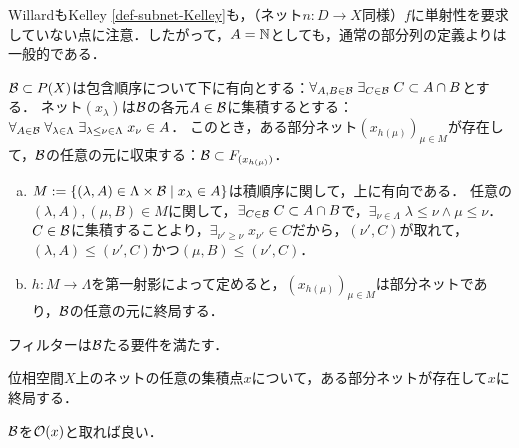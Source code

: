 \documentclass[uplatex,dvipdfmx]{jsreport}
\begin{document}
\begin{remark}
    WillardもKelley \ref{def-subnet-Kelley}も，（ネット$n:D\to X$同様）$f$に単射性を要求していない点に注意．したがって，$A=\mathbb{N}$としても，通常の部分列の定義よりは一般的である．
\end{remark}

\begin{lemma}[集積点の特徴付け]
    $\mathcal{B}\subset P(X)$は包含順序について下に有向とする：$\forall_{A,B\in\mathcal{B}}\;\exists_{C\in\mathcal{B}}\;C\subset A\cap B$とする．
    ネット$(x_\lambda)$は$\mathcal{B}$の各元$A\in\mathcal{B}$に集積するとする：
    $\forall_{A\in\mathcal{B}}\;\forall_{\lambda\in\Lambda}\;\exists_{\lambda\le\nu\in\Lambda}\;x_\nu\in A$．
    このとき，ある部分ネット$(x_{h(\mu)})_{\mu\in M}$が存在して，$\mathcal{B}$の任意の元に収束する：$\mathcal{B}\subset F_{(x_{h(\mu)})}$．
\end{lemma}
\begin{Proof}\mbox{}
    \begin{enumerate}[(a)]
        \item $M:=\left\{(\lambda,A)\in\Lambda\times\mathcal{B}\mid x_\lambda\in A\right\}$は積順序に関して，上に有向である．
        任意の$(\lambda,A),(\mu,B)\in M$に関して，$\exists_{C\in\mathcal{B}}\;C\subset A\cap B$で，$\exists_{\nu\in\Lambda}\;\lambda\le\nu\land\mu\le\nu$．
        $C\in\mathcal{B}$に集積することより，$\exists_{\nu'\ge\nu}\;x_{\nu'}\in C$だから，$(\nu',C)$が取れて，$(\lambda,A)\le(\nu',C)$かつ$(\mu,B)\le(\nu',C)$．
        \item $h:M\to\Lambda$を第一射影によって定めると，$(x_{h(\mu)})_{\mu\in M}$は部分ネットであり，$\mathcal{B}$の任意の元に終局する．
    \end{enumerate}
\end{Proof}
\begin{remarks}
    フィルターは$\mathcal{B}$たる要件を満たす．
\end{remarks}

\begin{corollary}
    位相空間$X$上のネットの任意の集積点$x$について，ある部分ネットが存在して$x$に終局する．
\end{corollary}
\begin{Proof}
    $\mathcal{B}$を$\mathcal{O}(x)$と取れば良い．
\end{Proof}
\end{document}
